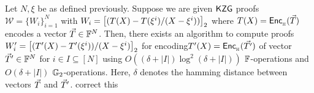 \begin{lemma}\label{lem:approx-setup}
Let $N,\xi$ be as defined previously. Suppose we are given
$\mathsf{KZG}$ proofs $\mathcal{W}=\{W_i\}_{i=1}^N$ with $W_i=\left[{(T(X) - T(\xi^i)/(X-\xi^i))}\right]_2$ where
$T(X)=\mathsf{Enc}_{{}_{\mathbb{H}}}(\vec{T})$ encodes a vector $\vec{T}\in \mathbb{F}^N$. Then,
there exists an algorithm to compute proofs
$W_i'=\left[{(T'(X) - T'(\xi^i))/(X-\xi^i)}\right]_2$ for encoding$T'(X)=\mathsf{Enc}_{{}_{\mathbb{H}}}(\vec{T'})$ of vector $\vec{T}'\in \mathbb{F}^N$
for $i\in I\subseteq [N]$ using $O((\delta + |I|) \log^2 (\delta + |I|))$ $\mathbb{F}$-operations and $O(\delta + |I|)$ $\mathbb{G}_2$-operations.
Here, $\delta$ denotes the hamming distance
between vectors $\vec{T}$ and $\vec{T}'$.
    correct this
\end{lemma}